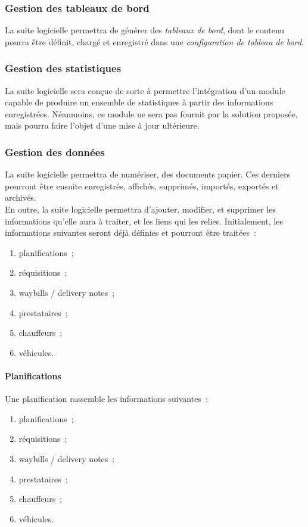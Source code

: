 \subsubsection{Gestion des tableaux de bord}
La suite logicielle permettra de générer des \emph{tableaux de bord}, dont le contenu pourra être définit, chargé et enregistré dans une \emph{configuration de tableau de bord}.

\subsubsection{Gestion des statistiques}
La suite logicielle sera conçue de sorte à permettre l'intégration d'un module capable de produire un ensemble de statistiques à partir des informations enregistrées. Néanmoins, ce module ne sera pas fournit par la solution proposée, mais pourra faire l'objet d'une mise à jour ultérieure.

\subsubsection{Gestion des données}
La suite logicielle permettra de numériser, des documents papier. Ces derniers pourront être ensuite enregistrés, affichés, supprimés, importés, exportés et archivés.
\\
En outre, la suite logicielle permettra d'ajouter, modifier, et supprimer les informations qu'elle aura à traiter, et les liens qui les relies. Initialement, les informations suivantes seront déjà définies et pourront être traitées~:
\begin{enumerate}
	\item planifications~;
	\item réquisitions~;
	\item waybills / delivery notes~;
	\item prestataires~;
	\item chauffeurs~;
	\item véhicules.
\end{enumerate}

\paragraph{Planifications}
Une planification rassemble les informations suivantes~:
\begin{enumerate}
	\item planifications~;
	\item réquisitions~;
	\item waybills / delivery notes~;
	\item prestataires~;
	\item chauffeurs~;
	\item véhicules.
\end{enumerate}

